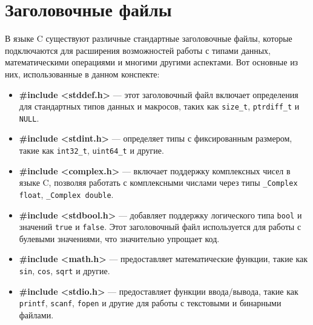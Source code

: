 \documentclass[a4paper,12pt]{article}
\begin{document}
\section{Заголовочные файлы}

В языке C существуют различные стандартные заголовочные файлы, которые подключаются для расширения возможностей работы с типами данных, математическими операциями и многими другими аспектами. Вот основные из них, использованные в данном конспекте:

\begin{itemize}
    \item \textbf{\#include <stddef.h>} — этот заголовочный файл включает определения для стандартных типов данных и макросов, таких как \texttt{size\_t}, \texttt{ptrdiff\_t} и \texttt{NULL}.
    \item \textbf{\#include <stdint.h>} — определяет типы с фиксированным размером, такие как \texttt{int32\_t}, \texttt{uint64\_t} и другие.
    \item \textbf{\#include <complex.h>} — включает поддержку комплексных чисел в языке C, позволяя работать с комплексными числами через типы \texttt{\_Complex float}, \texttt{\_Complex double}.
    \item \textbf{\#include <stdbool.h>} — добавляет поддержку логического типа \texttt{bool} и значений \texttt{true} и \texttt{false}. Этот заголовочный файл используется для работы с булевыми значениями, что значительно упрощает код.
    \item \textbf{\#include <math.h>} — предоставляет математические функции, такие как \texttt{sin}, \texttt{cos}, \texttt{sqrt} и другие.
    \item \textbf{\#include <stdio.h>} — предоставляет функции ввода/вывода, такие как \texttt{printf}, \texttt{scanf}, \texttt{fopen} и другие для работы с текстовыми и бинарными файлами.
\end{itemize}
\end{document}
